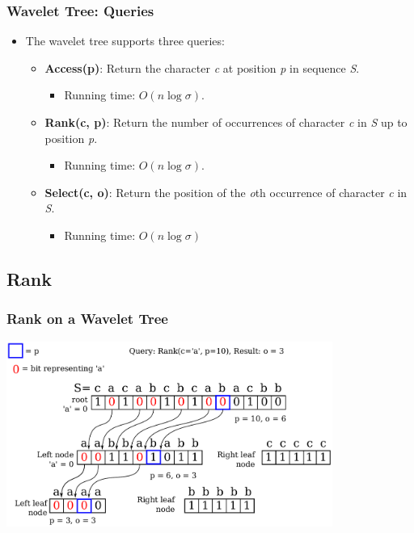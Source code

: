 \documentclass{beamer}
\begin{document}
\begin{frame}
\frametitle{Wavelet Tree: Queries}
\begin{itemize}
\item The wavelet tree supports three queries:
	\begin{itemize}
	\item \textbf{Access(p)}: Return the character \textit{c} at position \textit{p} in sequence \textit{S}.
		\begin{itemize}
		\item Running time: $O(n \log \sigma)$.
		\end{itemize}
	\item \textbf{Rank(c, p)}: Return the number of occurrences of character \textit{c} in \textit{S} up to position \textit{p}.
		\begin{itemize}
		\item Running time: $O(n \log \sigma)$.
		\end{itemize}
	\item \textbf{Select(c, o)}: Return the position of the \textit{o}th occurrence of character \textit{c} in \textit{S}.
		\begin{itemize}
		\item Running time: $O(n \log \sigma)$
		\end{itemize}
	\end{itemize}
\end{itemize}

\end{frame}


\subsection{Rank}
\begin{frame}
\frametitle{Rank on a Wavelet Tree}
\begin{center}
	\center \includegraphics[width=0.8\textwidth]{RankDrawing}
\end{center}
\end{frame}
\end{document}
